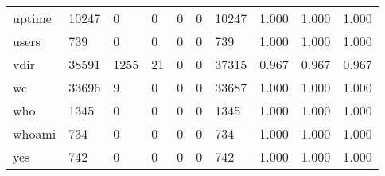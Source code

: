 \begin{longtable}{lp{1.3cm}p{1.3cm}p{1.3cm}p{1.3cm}p{1.3cm}p{1.3cm}p{1.3cm}p{1.3cm}p{1.3cm}}
uptime    &                  10247 &                                  0 &                                 0 &                                0 &                                 0 &                           10247 &                                1.000 &                                  1.000 &                                1.000 \\
users     &                    739 &                                  0 &                                 0 &                                0 &                                 0 &                             739 &                                1.000 &                                  1.000 &                                1.000 \\
vdir      &                  38591 &                               1255 &                                21 &                                0 &                                 0 &                           37315 &                                0.967 &                                  0.967 &                                0.967 \\
wc        &                  33696 &                                  9 &                                 0 &                                0 &                                 0 &                           33687 &                                1.000 &                                  1.000 &                                1.000 \\
who       &                   1345 &                                  0 &                                 0 &                                0 &                                 0 &                            1345 &                                1.000 &                                  1.000 &                                1.000 \\
whoami    &                    734 &                                  0 &                                 0 &                                0 &                                 0 &                             734 &                                1.000 &                                  1.000 &                                1.000 \\
yes       &                    742 &                                  0 &                                 0 &                                0 &                                 0 &                             742 &                                1.000 &                                  1.000 &                                1.000 \\
\end{longtable}
